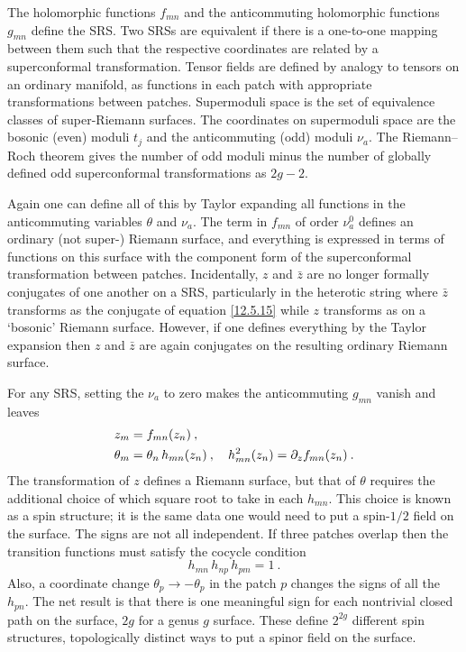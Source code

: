 \noindent The holomorphic functions $f_{mn}$ and the anticommuting holomorphic functions $g_{mn}$ define the SRS. Two SRSs are equivalent if there is a one-to-one mapping between them such that the respective coordinates are related by a superconformal transformation. Tensor fields are defined by analogy to tensors on an ordinary manifold, as functions in each patch with appropriate transformations between patches. Supermoduli space is the set of equivalence classes of super-Riemann surfaces. The coordinates on supermoduli space are the bosonic (even) moduli $t_j$ and the anticommuting (odd) moduli $\nu_a$. The Riemann--Roch theorem gives the number of odd moduli minus the number of globally defined odd superconformal transformations as $2g - 2$.

Again one can define all of this by Taylor expanding all functions in the anticommuting variables $\theta$ and $\nu_a$. The term in $f_{mn}$ of order $\nu_a^0$ defines an ordinary (not super-) Riemann surface, and everything is expressed in terms of functions on this surface with the component form of the superconformal transformation between patches. Incidentally, $z$ and $\bar{z}$ are no longer formally conjugates of one another on a SRS, particularly in the heterotic string where $\bar{z}$ transforms as the conjugate of equation \eqref{12.5.15} while $z$ transforms as on a `bosonic' Riemann surface. However, if one defines everything by the Taylor expansion then $z$ and $\bar{z}$ are again conjugates on the resulting ordinary Riemann surface.

For any SRS, setting the $\nu_a$ to zero makes the anticommuting $g_{mn}$ vanish and leaves
\begin{subequations} \label{12.5.16}
	\begin{align}
		z_m &= f_{mn}(z_n) \:, \label{12.5.16a} \\
		\theta_m &= \theta_n\,h_{mn}(z_n) \:, \quad h_{mn}^2(z_n) = \partial_z f_{mn}(z_n) \:. \label{12.5.16b}
	\end{align}
\end{subequations}
The transformation of $z$ defines a Riemann surface, but that of $\theta$ requires the additional choice of which square root to take in each $h_{mn}$. This choice is known as a spin structure; it is the same data one would need to put a spin-$1/2$ field on the surface. The signs are not all independent. If three patches overlap then the transition functions must satisfy the cocycle condition
\begin{equation}
	h_{mn}\,h_{np}\,h_{pm} = 1 \:. \label{12.5.17}
\end{equation}
Also, a coordinate change $\theta_p \to -\theta_p$ in the patch $p$ changes the signs of all the $h_{pn}$. The net result is that there is one meaningful sign for each nontrivial closed path on the surface, $2g$ for a genus $g$ surface. These define $2^{2g}$ different spin structures, topologically distinct ways to put a spinor field on the surface.


